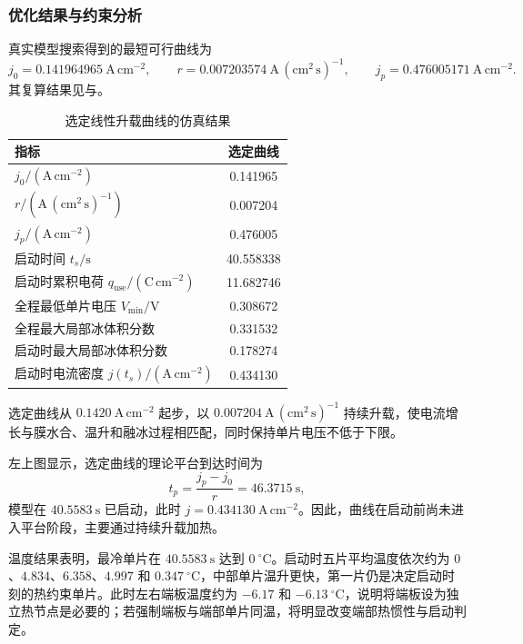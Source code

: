 \documentclass{gmcmthesis}
\begin{document}
\subsubsection{优化结果与约束分析}

真实模型搜索得到的最短可行曲线为
\begin{equation}
  j_0=0.141964965~\mathrm{A\,cm^{-2}},\qquad
  r=0.007203574~\mathrm{A\,(cm^2\,s)^{-1}},\qquad
  j_p=0.476005171~\mathrm{A\,cm^{-2}}.
  \label{eq:q2-best-strategy}
\end{equation}
其复算结果见与。

\begin{table}[H]
  \centering
  \caption{选定线性升载曲线的仿真结果}
  \label{tab:q2-results}
  \begin{tabular}{lc}
    \toprule
    指标 & 选定曲线\\
    \midrule
    $j_0/(\mathrm{A\,cm^{-2}})$ & 0.141965\\
    $r/(\mathrm{A\,(cm^2\,s)^{-1}})$ & 0.007204\\
    $j_p/(\mathrm{A\,cm^{-2}})$ & 0.476005\\
    启动时间 $t_s/\mathrm{s}$ & 40.558338\\
    启动时累积电荷 $q_{\mathrm{use}}/(\mathrm{C\,cm^{-2}})$ & 11.682746\\
    全程最低单片电压 $V_{\min}/\mathrm{V}$ & 0.308672\\
    全程最大局部冰体积分数 & 0.331532\\
    启动时最大局部冰体积分数 & 0.178274\\
    启动时电流密度 $j(t_s)/(\mathrm{A\,cm^{-2}})$ & 0.434130\\
    \bottomrule
  \end{tabular}
\end{table}

选定曲线从 $0.1420~\mathrm{A\,cm^{-2}}$ 起步，以 $0.007204~\mathrm{A\,(cm^2\,s)^{-1}}$ 持续升载，使电流增长与膜水合、温升和融冰过程相匹配，同时保持单片电压不低于下限。

左上图显示，选定曲线的理论平台到达时间为
\begin{equation}
  t_p=\frac{j_p-j_0}{r}=46.3715~\mathrm{s},
\end{equation}
模型在 $40.5583~\mathrm{s}$ 已启动，此时 $j=0.434130~\mathrm{A\,cm^{-2}}$。因此，曲线在启动前尚未进入平台阶段，主要通过持续升载加热。

温度结果表明，最冷单片在 $40.5583~\mathrm{s}$ 达到 $0~^{\circ}\mathrm{C}$。启动时五片平均温度依次约为 $0$、$4.834$、$6.358$、$4.997$ 和 $0.347~^{\circ}\mathrm{C}$，中部单片温升更快，第一片仍是决定启动时刻的热约束单片。此时左右端板温度约为 $-6.17$ 和 $-6.13~^{\circ}\mathrm{C}$，说明将端板设为独立热节点是必要的；若强制端板与端部单片同温，将明显改变端部热惯性与启动判定。
\end{document}
